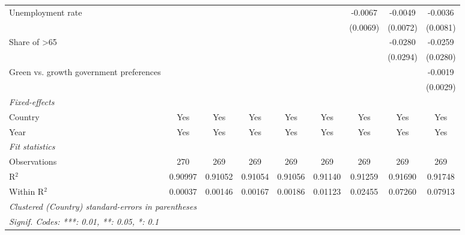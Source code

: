 \begin{table}[htbp]
\begin{tabular}{lcccccccc}
      Unemployment rate                         &          &          &                       &                       &          & -0.0067  & -0.0049  & -0.0036\\   
                                                &          &          &                       &                       &          & (0.0069) & (0.0072) & (0.0081)\\   
      Share of >65                              &          &          &                       &                       &          &          & -0.0280  & -0.0259\\   
                                                &          &          &                       &                       &          &          & (0.0294) & (0.0280)\\   
      Green vs. growth government preferences   &          &          &                       &                       &          &          &          & -0.0019\\   
                                                &          &          &                       &                       &          &          &          & (0.0029)\\   
      \midrule
      \emph{Fixed-effects}\\
      Country                                   & Yes      & Yes      & Yes                   & Yes                   & Yes      & Yes      & Yes      & Yes\\  
      Year                                      & Yes      & Yes      & Yes                   & Yes                   & Yes      & Yes      & Yes      & Yes\\  
      \midrule
      \emph{Fit statistics}\\
      Observations                              & 270      & 269      & 269                   & 269                   & 269      & 269      & 269      & 269\\  
      R$^2$                                     & 0.90997  & 0.91052  & 0.91054               & 0.91056               & 0.91140  & 0.91259  & 0.91690  & 0.91748\\  
      Within R$^2$                              & 0.00037  & 0.00146  & 0.00167               & 0.00186               & 0.01123  & 0.02455  & 0.07260  & 0.07913\\  
      \midrule \midrule
      \multicolumn{9}{l}{\emph{Clustered (Country) standard-errors in parentheses}}\\
      \multicolumn{9}{l}{\emph{Signif. Codes: ***: 0.01, **: 0.05, *: 0.1}}\\
   \end{tabular}
\end{table}


